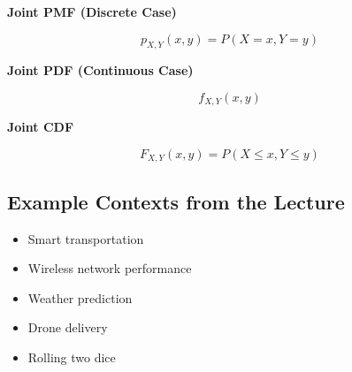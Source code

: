 \documentclass[12pt]{article}
\begin{document}
\textbf{Joint PMF (Discrete Case)}

\[
p_{X,Y}(x,y) = P(X=x, Y=y)
\]

\textbf{Joint PDF (Continuous Case)}

\[
f_{X,Y}(x,y)
\]

\textbf{Joint CDF}

\[
F_{X,Y}(x,y) = P(X \le x, Y \le y)
\]

\subsection*{Example Contexts from the Lecture}

\begin{itemize}
\item Smart transportation
\item Wireless network performance
\item Weather prediction
\item Drone delivery
\item Rolling two dice
\end{itemize}
\end{document}
